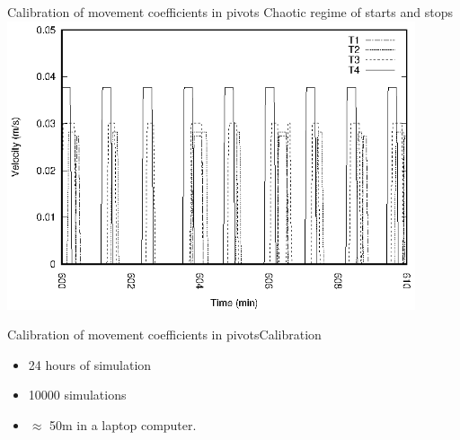 \documentclass[10pt]{beamer}
\begin{document}
\begin{frame}{Calibration of movement coefficients in pivots}
{Chaotic regime of starts and stops}
	\includegraphics[width=0.9\textwidth]{pivot-velocity.eps}
\end{frame}

\begin{frame}{Calibration of movement coefficients in pivots}{Calibration}
	\begin{itemize}
		\item 24 hours of simulation
		\item 10000 simulations
		\item $\approx$ 50m in a laptop computer.
	\end{itemize}
\end{frame}
\end{document}
